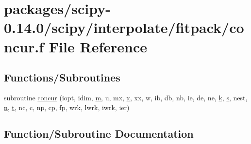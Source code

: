 \hypertarget{concur_8f}{}\section{packages/scipy-\/0.14.0/scipy/interpolate/fitpack/concur.f File Reference}
\label{concur_8f}
\subsection*{Functions/\+Subroutines}
\begin{DoxyCompactItemize}
\item 
subroutine \hyperlink{concur_8f_acda7da807f50bf8b3d4e7e7408cce8d0}{concur} (iopt, idim, \hyperlink{indexexpr_8h_ab72fdb4031d47b75ab26dd18a437bcdc}{m}, u, mx, \hyperlink{vecnorm1_8cc_ac73eed9e41ec09d58f112f06c2d6cb63}{x}, xx, w, ib, db, nb, ie, de, ne, \hyperlink{indexexpr_8h_abb72938a198351550846b37a84588b63}{k}, \hyperlink{indexexpr_8h_ae024b0db549122b44c349ae28ec990dc}{s}, nest, \hyperlink{indexexpr_8h_ab427e2e2b4d6cec55fa088ea2a692ace}{n}, \hyperlink{indexexpr_8h_a01709998b82be3f34e0412206618d09d}{t}, nc, c, np, cp, fp, wrk, lwrk, iwrk, ier)
\end{DoxyCompactItemize}


\subsection{Function/\+Subroutine Documentation}
\hypertarget{concur_8f_acda7da807f50bf8b3d4e7e7408cce8d0}{}
